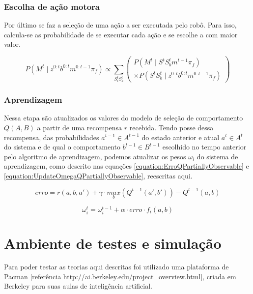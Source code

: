 \subsubsection{Escolha de ação motora}

Por último se faz a seleção de uma ação a ser executada pelo robô. Para isso, calcula-se as probabilidade de se executar cada ação e se escolhe a com maior valor.

\begin{equation}
    P \left( M^t \mid z^{0: t} b^{0: t} m^{0: t-1} \pi_f \right) \propto \sum\limits_{S_i^t S_b^t}
        \left(
            \begin{array}{l}
                P \left( M^t \mid S^t S_b^t m^{t-1} \pi_f \right)\\
                \times P \left( S^t S_b^t \mid z^{0: t} b^{0: t} m^{0: t-1} \pi_f \right)
            \end{array}
        \right)
\end{equation}


\subsubsection{Aprendizagem}

Nessa etapa são atualizados os valores do modelo de seleção de comportamento $ Q \left( A, B \right) $ a partir de uma recompensa $ r $ recebida. Tendo posse dessa recompensa, das probabilidades $ a^{t-1} \in A^{t-1} $ do estado anterior e atual $ a^t \in A^t $ do sistema e de qual o comportamento $ b^{t-1} \in B^{t-1} $ escolhido no tempo anterior pelo algoritmo de aprendizagem, podemos atualizar os pesos $ \omega_i $ do sistema de aprendizagem, como descrito nas equações \ref{equation:ErroQPartiallyObservable} e \ref{equation:UpdateOmegaQPartiallyObservable}, reescritas aqui.

$$
	erro = r \left( a, b, a' \right) + \gamma \cdot \underset{b}{max} \left( Q^{t-1} \left( a', b' \right) \right) - Q^{t-1} \left( a, b \right)
$$

$$
	\omega_i^t = \omega_i^{t-1} + \alpha \cdot erro \cdot f_i \left( a, b \right)
$$



\section{Ambiente de testes e simulação} \label{section:AmbienteDeTestes}

Para poder testar as teorias aqui descritas foi utilizado uma plataforma de Pacman [referência http://ai.berkeley.edu/project\_overview.html], criada em Berkeley para suas aulas de inteligência artificial.

